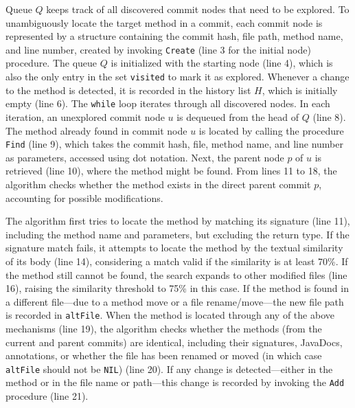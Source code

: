 Queue \( Q \) keeps track of all discovered commit nodes that need to be explored. To unambiguously locate the target method in a commit, each commit node is represented by a structure containing the commit hash, file path, method name, and line number, created by invoking \texttt{Create} (line 3 for the initial node) procedure. The queue \( Q \) is initialized with the starting node (line 4), which is also the only entry in the set \texttt{visited} to mark it as explored. Whenever a change to the method is detected, it is recorded in the history list \( H \), which is initially empty (line 6). The \texttt{while} loop iterates through all discovered nodes. In each iteration, an unexplored commit node \( u \) is dequeued from the head of \( Q \) (line 8). The method already found in commit node \( u \) is located by calling the procedure \texttt{Find} (line 9), which takes the commit hash, file, method name, and line number as parameters, accessed using dot notation. Next, the parent node \( p \) of \( u \) is retrieved (line 10), where the method might be found. From lines 11 to 18, the algorithm checks whether the method exists in the direct parent commit \( p \), accounting for possible modifications.




The algorithm first tries to locate the method by matching its signature (line 11), including the method name and parameters, but excluding the return type. If the signature match fails, it attempts to locate the method by the textual similarity of its body (line 14), considering a match valid if the similarity is at least 70\%. If the method still cannot be found, the search expands to other modified files (line 16), raising the similarity threshold to 75\% in this case. If the method is found in a different file—due to a method move or a file rename/move—the new file path is recorded in \texttt{altFile}. When the method is located through any of the above mechanisms (line 19), the algorithm checks whether the methods (from the current and parent commits) are identical, including their signatures, JavaDocs, annotations, or whether the file has been renamed or moved (in which case \texttt{altFile} should not be \texttt{NIL}) (line 20). If any change is detected—either in the method or in the file name or path—this change is recorded by invoking the \texttt{Add} procedure (line 21).

